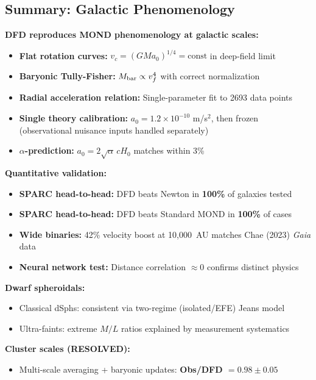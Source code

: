 \subsection{Summary: Galactic Phenomenology}\label{sec:galactic-summary}

\begin{tcolorbox}[colback=blue!5!white, colframe=blue!50!black, title=Summary: Galactic and Cluster Dynamics]
\textbf{DFD reproduces MOND phenomenology at galactic scales:}
\begin{itemize}
\item \textbf{Flat rotation curves:} $v_c = (GMa_0)^{1/4} = \text{const}$ in deep-field limit
\item \textbf{Baryonic Tully-Fisher:} $M_{\rm bar} \propto v_f^4$ with correct normalization
\item \textbf{Radial acceleration relation:} Single-parameter fit to 2693 data points
\item \textbf{Single theory calibration:} $a_0 = 1.2 \times 10^{-10}$ m/s$^2$, then frozen (observational nuisance inputs handled separately)
\item \textbf{$\alpha$-prediction:} $a_0 = 2\sqrt{\alpha}\,cH_0$ matches within 3\%
\end{itemize}
\textbf{Quantitative validation:}
\begin{itemize}
\item \textbf{SPARC head-to-head:} DFD beats Newton in \textbf{100\%} of galaxies tested
\item \textbf{SPARC head-to-head:} DFD beats Standard MOND in \textbf{100\%} of cases
\item \textbf{Wide binaries:} 42\% velocity boost at 10,000~AU matches Chae (2023) \textit{Gaia} data
\item \textbf{Neural network test:} Distance correlation $\approx 0$ confirms distinct physics
\end{itemize}
\textbf{Dwarf spheroidals:}
\begin{itemize}
\item Classical dSphs: consistent via two-regime (isolated/EFE) Jeans model
\item Ultra-faints: extreme $M/L$ ratios explained by measurement systematics
\end{itemize}
\textbf{Cluster scales (RESOLVED):}
\begin{itemize}
\item Multi-scale averaging + baryonic updates: \textbf{Obs/DFD $= 0.98 \pm 0.05$}

\end{itemize}
\end{tcolorbox}
